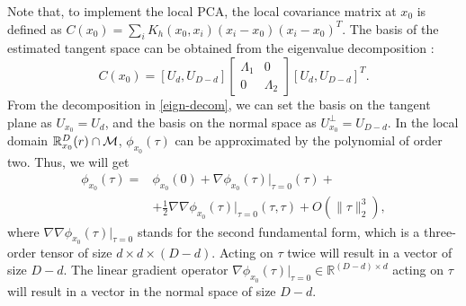 \documentclass{article}
\theoremstyle{remark}
\begin{document}
Note that, to implement the local PCA, the local covariance matrix at $x_0$ is defined as $C(x_0) = \sum_i K_h(x_0,x_i) (x_i-x_0)(x_i-x_0)^T$. The basis of the estimated tangent space can be obtained from the eigenvalue decomposition \cite{horn2012matrix}:
\begin{equation}\label{eign-decom}
C(x_0) = [U_d , U_{D-d}] 
\left[
\begin{array}{cc}
\Lambda_1& 0\\
0 & \Lambda_2
\end{array}\right]
 [U_d , U_{D-d}]^T.
\end{equation}
From the decomposition in \eqref{eign-decom}, we can set the basis on the tangent plane as $U_{x_0} = U_d$, and the basis on the normal space as $U_{x_0}^\perp = U_{D-d}$. In the local domain ${\mathbb R}_{x_0}^D (r)\cap \cal M$,  $\phi_{x_0}(\tau)$ can be approximated by the polynomial of order two. Thus, we will get
\begin{equation}\label{app_phi}
\begin{aligned}
\phi_{x_0}(\tau) =& \phi_{x_0}(0)+ \nabla {\phi_{x_0}}(\tau)|_{\tau=0}(\tau)+ \\
&+\frac{1}{2}{\nabla\nabla\phi_{x_0}(\tau)|_{\tau=0}}(\tau, \tau)+O(\|\tau\|_2^3),
\end{aligned}
\end{equation}
where ${\nabla\nabla\phi_{x_0}(\tau)|_{\tau=0}}$ stands for the second fundamental form, which is a three-order tensor of size $ d\times d\times (D-d)$. Acting on $\tau$ twice will result in a vector of size $D-d$.  The linear gradient operator  $\nabla {\phi_{x_0}}(\tau)|_{\tau=0}\in \mathbb{R}^{{(D-d)}\times d}$ acting on $\tau$ will result in a vector in the normal space of size $D-d$.
\end{document}
